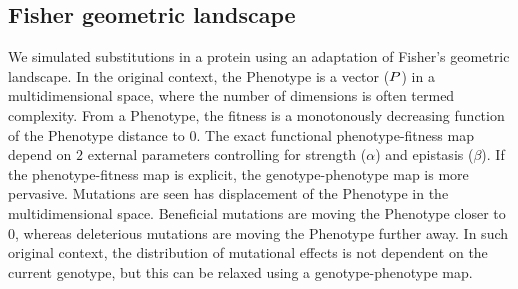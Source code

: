 \begin{table}[H]
    \centering
    \noindent{}
    \caption[Inferred amino-acid entropy for SimuPoly]{
    Estimated amino-acids entropy under simulation accounting for finite population effects, site linkage and short term fluctuation of $\Ne$.
    Obtained with the inference model of site selection for amino-acid, and branch fluctuation of $\Ne$ (left column), or under the assumption of constant $\Ne$ (right column)}
\end{table}

\subsection{Fisher geometric landscape}
\label{subsec:fisher-geometric-landscape}

We simulated \glspl{substitution} in a protein using an adaptation of Fisher's geometric landscape.
In the original context, the \gls{Phenotype} is a vector ($P$) in a multidimensional space, where the number of dimensions is often termed complexity.
From a \gls{Phenotype}, the fitness is a monotonously decreasing function of the \gls{Phenotype} distance to $0$.
The exact functional phenotype-fitness map depend on $2$ external parameters controlling for strength ($\alpha$) and epistasis ($\beta$).
If the phenotype-fitness map is explicit, the genotype-phenotype map is more pervasive.
Mutations are seen has displacement of the \gls{Phenotype} in the multidimensional space.
Beneficial mutations are moving the \gls{Phenotype} closer to $0$, whereas deleterious mutations are moving the \gls{Phenotype} further away.
In such original context, the distribution of mutational effects is not dependent on the current genotype, but this can be relaxed using a genotype-phenotype map.\\

